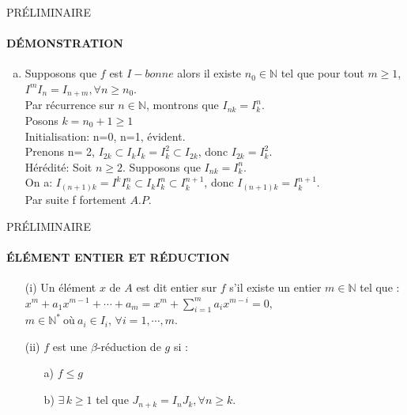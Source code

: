 \documentclass[11pt,a4paper]{beamer}
\begin{document}
	\begin{frame}{PRÉLIMINAIRE}
		\framesubtitle{DÉMONSTRATION}
		\begin{block}{}
			\begin{enumerate}[(v)]
				\item Supposons que $f$ est $I-bonne$ alors il existe $n_0 \in \mathbb{N}$ tel que pour tout $m\geqslant 1 $, $I^mI_n = I_{n+m}, \forall n \geqslant n_0.$\\
				Par récurrence sur $n \in \mathbb{N}$, montrons que $I_{nk} = I_k^n$.\\
				Posons $k= n_0+1 \geqslant 1$\\
				Initialisation: n=0, n=1, évident.\\
				Prenons n= 2, $I_{2k} \subset I_kI_k=I_k^2 \subset I_{2k}$, donc $I_{2k} = I_k^2$.\\
				Hérédité: Soit $n \geqslant 2$. Supposons que $I_{nk} = I_k^n$.\\
				On a: $I_{(n+1)k}= I^kI_k^n\subset I_kI_k^n \subset I_k^{n+1}$, donc $I_{(n+1)k} = I_k^{n+1}$.\\
				Par suite f fortement $A.P.$
			\end{enumerate}
		\end{block}
	\end{frame}
	\begin{frame}{PRÉLIMINAIRE}
		\framesubtitle{ÉLÉMENT ENTIER ET RÉDUCTION}
		\begin{block}{}
			\begin{enumerate}
				\item[(i)] Un élément $x$ de $A$ est dit entier sur $f$ s'il existe un entier $m \in \mathbb{N}$ tel que : $x^m + a_1 x^{m-1} + \cdots + a_m = x^m + \sum_{i=1}^{m} a_i x^{m-i} = 0,$\\$ m \in \mathbb{N^*} \ \text{où} \ a_i \in I_i,\, \forall i=1, \cdots ,m.$
				\item[(ii)] $f$ est une $\beta$-réduction de $g$ si : \\
				\begin{enumerate}
					\item[a)] $f \leq g$
					\item[b)]  $\exists \, k \geq 1$ tel que $J_{n+k} = I_n J_k , \forall n \geq k$.
				\end{enumerate}
			\end{enumerate}
		\end{block}
	\end{frame}
	
\end{document}
